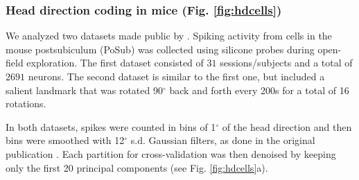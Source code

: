 








\subsubsection{Head direction coding in mice (Fig. \ref{fig:hdcells})}

We analyzed two datasets made public by \textcite{duszkiewicz}.
Spiking activity from cells in the mouse postsubiculum (PoSub) was collected using silicone probes during open-field exploration. 
The first dataset consisted of $31$ sessions/subjects and a total of $2691$ neurons. The second dataset is similar to the first one, but included a salient landmark that was rotated 90$^{\circ}$  back and forth every 200s for a total of 16 rotations. 

In both datasets, spikes were counted in bins of 1$^{\circ}$ of the head direction and then bins were smoothed with 12$^{\circ}$  s.d. Gaussian filters, as done in the original publication \parencite{duszkiewicz}.
Each partition for cross-validation was then denoised by keeping only the first 20 principal components (see Fig. \ref{fig:hdcells}a).  

